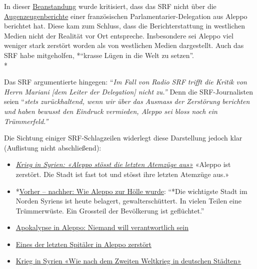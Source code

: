 In dieser
\href{https://www.srgd.ch/de/aktuelles/news/2017/02/13/syrien-berichterstattung-von-radio-und-fernsehen-srf-beanstandet/}{Beanstandung}
wurde kritisiert, dass das SRF nicht über die
\href{http://www.francetvinfo.fr/monde/revolte-en-syrie/deputes-francais-en-syrie-de-damas-a-alep-l-ami-thierry-mariani-vient-voir-la-realite-du-terrain_2003971.html}{Augenzeugenberichte}
einer französischen Parlamentarier-Delegation aus Aleppo berichtet hat.
Diese kam zum Schluss, dass die Berichterstattung in westlichen Medien
nicht der Realität vor Ort entspreche. Insbesondere sei Aleppo viel
weniger stark zerstört worden als von westlichen Medien dargestellt.
Auch das SRF habe mitgeholfen, *``krasse Lügen in die Welt zu
setzen''.\\
*

Das SRF argumentierte hingegen: ``\emph{Im Fall von Radio SRF trifft die
Kritik von Herrn Mariani {[}dem Leiter der Delegation{]} nicht zu.''}
Denn die SRF-Journalisten seien ``\emph{stets zurückhaltend, wenn wir
über das Ausmass der Zerstörung berichten und haben bewusst den Eindruck
vermieden, Aleppo sei bloss noch ein Trümmerfeld.''}

Die Sichtung einiger SRF-Schlagzeilen widerlegt diese Darstellung jedoch
klar (Auflistung nicht abschließend):

\begin{itemize}
\tightlist
\item
  \emph{\href{http://www.srf.ch/news/international/aleppo-stoesst-die-letzten-atemzuege-aus}{Krieg
  in Syrien: «Aleppo stösst die letzten Atemzüge aus»}} «Aleppo ist
  zerstört. Die Stadt ist fast tot und stösst ihre letzten Atemzüge
  aus.»
\item
  *\href{http://www.srf.ch/news/international/vorher-nachher-wie-aleppo-zur-hoelle-wurde}{Vorher
  -- nachher: Wie Aleppo zur Hölle wurde}: ``*Die wichtigste Stadt im
  Norden Syriens ist heute belagert, gewalterschüttert. In vielen Teilen
  eine Trümmerwüste. Ein Grossteil der Bevölkerung ist geflüchtet.''
\item
  \href{http://www.srf.ch/news/international/apokalypse-in-aleppo-niemand-will-verantwortlich-sein}{Apokalypse
  in Aleppo: Niemand will verantwortlich sein}
\item
  \href{http://www.srf.ch/news/international/eines-der-letzten-spitaeler-in-aleppo-zerstoert}{Eines
  der letzten Spitäler in Aleppo zerstört}
\item
  \href{https://www.srf.ch/news/international/wie-nach-dem-zweiten-weltkrieg-in-deutschen-staedten}{Krieg
  in Syrien «Wie nach dem Zweiten Weltkrieg in deutschen Städten»}
\end{itemize}

